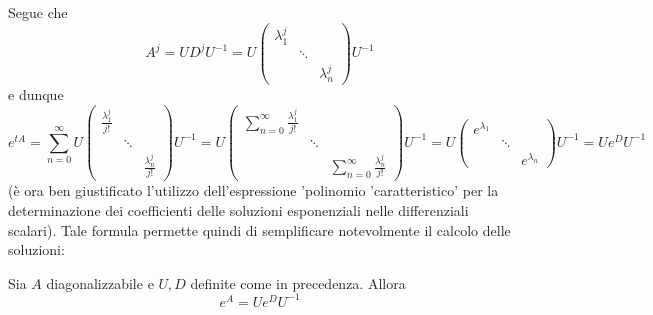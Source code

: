 \documentclass[10pt]{article}
\theoremstyle{plain}
\begin{document}
Segue che
\[A^j = U D^j U^{-1} = U \begin{pmatrix}
\lambda_1^j &  & \\
& \ddots & \\
& & \lambda_n^j
\end{pmatrix} U^{-1}\]
e dunque
\[e^{tA} = \sum\limits_{n=0}^\infty U \begin{pmatrix}
\displaystyle \frac{\lambda_1^j}{j!} &  & \\
& \ddots & \\
& & \displaystyle \frac{\lambda_n^j}{j!}
\end{pmatrix} U^{-1} = U \begin{pmatrix}
\displaystyle \sum\limits_{n=0}^\infty \frac{\lambda_1^j}{j!} &  & \\
& \ddots & \\
& & \displaystyle \sum\limits_{n=0}^\infty \frac{\lambda_n^j}{j!}
\end{pmatrix}U^{-1} = U \begin{pmatrix}
\displaystyle e^{\lambda_1} &  & \\
& \ddots & \\
& & \displaystyle e^{\lambda_n}
\end{pmatrix}U^{-1} = U e^D U^{-1}\]
(è ora ben giustificato l'utilizzo dell'espressione 'polinomio 'caratteristico' per la determinazione dei coefficienti delle soluzioni esponenziali nelle differenziali scalari). Tale formula permette quindi di semplificare notevolmente il calcolo delle soluzioni:
\begin{lem}
	Sia $A$ diagonalizzabile e $U, D$ definite come in precedenza. Allora
	\[e^A = U e^D U^{-1}\]
\end{lem}
\end{document}
